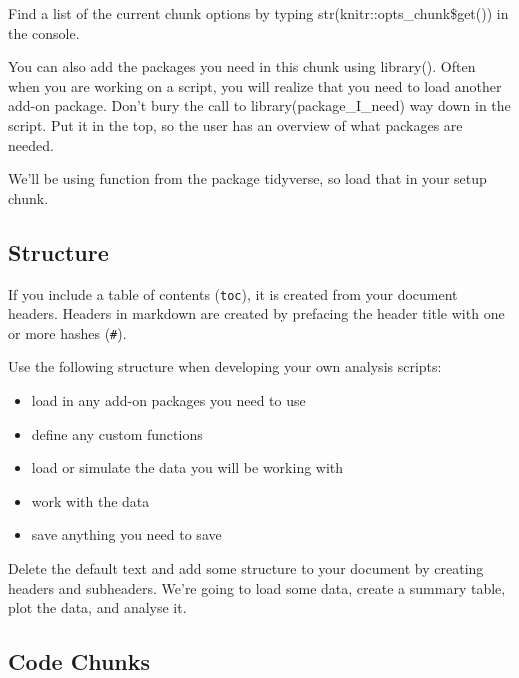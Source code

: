 \documentclass[
  oneside]{book}
\providecommand{\tightlist}{%
  \setlength{\itemsep}{0pt}\setlength{\parskip}{0pt}}
\begin{document}
Find a list of the current chunk options by typing {str}{(}{knitr}{::}{opts\_chunk}{\$}{get}{(}{)}{)} in the console.

You can also add the packages you need in this chunk using {library}{(}{)}. Often when you are working on a script, you will realize that you need to load another add-on package. Don't bury the call to {library}{(}{package\_I\_need}{)} way down in the script. Put it in the top, so the user has an overview of what packages are needed.

\begin{try}
We'll be using function from the package tidyverse, so load that in your setup chunk.

\end{try}

\hypertarget{structure}{%
\subsection{Structure}\label{structure}}

If you include a table of contents (\texttt{toc}), it is created from your document headers. Headers in markdown are created by prefacing the header title with one or more hashes (\texttt{\#}).

Use the following structure when developing your own analysis scripts:

\begin{itemize}
\tightlist
\item
  load in any add-on packages you need to use
\item
  define any custom functions
\item
  load or simulate the data you will be working with
\item
  work with the data
\item
  save anything you need to save
\end{itemize}

\begin{try}
Delete the default text and add some structure to your document by creating headers and subheaders. We're going to load some data, create a summary table, plot the data, and analyse it.

\end{try}

\hypertarget{code-chunks}{%
\subsection{Code Chunks}\label{code-chunks}}
\end{document}
